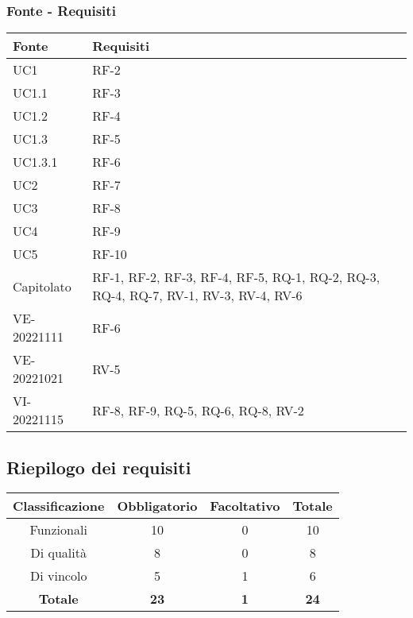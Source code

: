 \subsubsection{Fonte - Requisiti}
\begin{tabular}{| p{} | p{} |} 
 \hline
 \textbf{Fonte} & \textbf{Requisiti} \\
 \hline
	UC1 & RF-2\\
\hline
	UC1.1 & RF-3\\
\hline
	UC1.2 & RF-4\\
\hline
	UC1.3 & RF-5\\
\hline
	UC1.3.1 & RF-6\\
\hline
	UC2 & RF-7\\
\hline
	UC3 & RF-8\\
\hline
	UC4 & RF-9\\
\hline
	UC5 & RF-10\\
\hline
	Capitolato & RF-1, RF-2, RF-3, RF-4, RF-5, RQ-1, RQ-2, RQ-3, RQ-4, RQ-7, RV-1, RV-3, RV-4, RV-6\\
\hline
	VE-20221111 & RF-6\\
\hline
	VE-20221021 & RV-5\\
\hline
	VI-20221115 & RF-8, RF-9, RQ-5, RQ-6, RQ-8, RV-2\\
\hline
\end{tabular}

\subsection{Riepilogo dei requisiti}

\begin{tabular}{| c | c | c | c |} 
 \hline
 \textbf{Classificazione} & \textbf{Obbligatorio} & \textbf{Facoltativo} & \textbf{Totale} \\
 \hline
 Funzionali & 10 &  0 & 10\\
 \hline
  Di qualità & 8 & 0 & 8\\
 \hline
 Di vincolo & 5 & 1 & 6\\
 \hline
 \textbf{Totale} & \textbf{23} &\textbf {1} &  \textbf{24}\\
 \hline
\end{tabular}